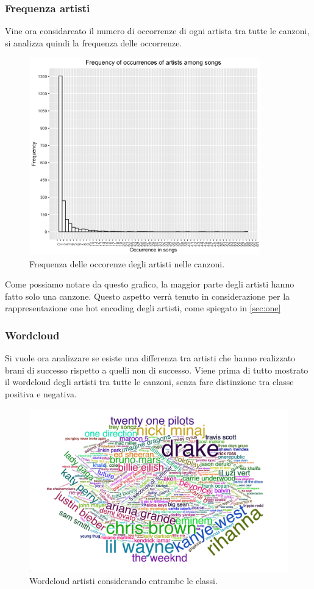 \subsubsection{Frequenza artisti}
\label{sec:freq_artisti}
Vine ora considareato il numero di occorrenze di ogni artista tra
tutte le canzoni, si analizza quindi la frequenza delle occorrenze.

\begin{figure}[H]
	\centering
	\includegraphics[width=10cm]{../images/artists_occurence.png}
	\caption{Frequenza delle occorenze degli artisti nelle canzoni.}
\end{figure}

Come possiamo notare da questo grafico, la maggior parte degli artisti
hanno fatto solo una canzone. Questo aspetto verrà tenuto in
considerazione per la rappresentazione one hot encoding degli artisti,
come spiegato in \autoref{sec:one}

\subsubsection{Wordcloud}
Si vuole ora analizzare se esiste una differenza tra artisti che hanno
realizzato brani di successo rispetto a quelli non di successo. Viene
prima di tutto mostrato il wordcloud degli artisti tra tutte le
canzoni, senza fare distinzione tra classe positiva e negativa.

\begin{figure}[H]
	\centering
	\includegraphics[width=14cm]{../images/wordcloud_overall_fix.png}
	\caption{Wordcloud artisti considerando entrambe le classi.}
\end{figure}

